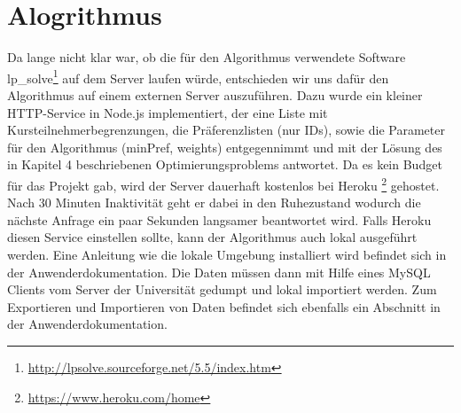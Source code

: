     \section{Alogrithmus}
	Da lange nicht klar war, ob die für den Algorithmus verwendete Software lp\_solve\footnote{\href{http://lpsolve.sourceforge.net/5.5/index.htm}{http://lpsolve.sourceforge.net/5.5/index.htm}} auf dem Server laufen würde, entschieden wir uns dafür den Algorithmus auf einem externen Server auszuführen. Dazu wurde ein kleiner HTTP-Service in Node.js implementiert, der eine Liste mit Kursteilnehmerbegrenzungen, die Präferenzlisten (nur IDs), sowie die Parameter für den Algorithmus (minPref, weights) entgegennimmt und mit der Lösung des in Kapitel 4 beschriebenen Optimierungsproblems antwortet.	Da es kein Budget für das Projekt gab, wird der Server dauerhaft kostenlos bei Heroku \footnote{\href{https://www.heroku.com/home}{https://www.heroku.com/home}} gehostet. Nach 30 Minuten Inaktivität geht er dabei in den Ruhezustand wodurch die nächste Anfrage ein paar Sekunden langsamer beantwortet wird. Falls Heroku diesen Service einstellen sollte, kann der Algorithmus auch lokal ausgeführt werden. Eine Anleitung wie die lokale Umgebung installiert wird befindet sich in der Anwenderdokumentation. Die Daten müssen dann mit Hilfe eines MySQL Clients vom Server der Universität gedumpt und lokal importiert werden. Zum Exportieren und Importieren von Daten befindet sich ebenfalls ein Abschnitt in der Anwenderdokumentation. 

